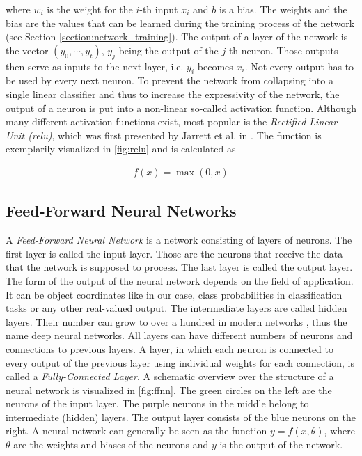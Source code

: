 \noindent where $w_i$ is the weight for the $i$-th input $x_i$ and $b$ is a bias. The weights and the bias are the values that can be learned during the training process of the network (see Section \ref{section:network_training}). The output of a layer of the network is the vector $(y_0, \cdots, y_t)$, $y_j$ being the output of the $j$-th neuron. Those outputs then serve as inputs to the next layer, i.e. $y_i$ becomes $x_i$. Not every output has to be used by every next neuron. To prevent the network from collapsing into a single linear classifier and thus to increase the expressivity of the network, the output of a neuron is put into a non-linear so-called activation function. Although many different activation functions exist, most popular is the \textit{Rectified Linear Unit (\gls{relu})}, which was first presented by Jarrett et al. in \cite{relu}. The function is exemplarily visualized in \fig \ref{fig:relu} and is calculated as

\begin{align}
f(x) = \max(0, x)
\end{align} 

\subsection{Feed-Forward Neural Networks}

A \textit{Feed-Forward Neural Network} is a network consisting of layers of neurons. The first layer is called the input layer. Those are the neurons that receive the data that the network is supposed to process. The last layer is called the output layer. The form of the output of the neural network depends on the field of application. It can be object coordinates like in our case, class probabilities in classification tasks or any other real-valued output. The intermediate layers are called hidden layers. Their number can grow to over a hundred in modern networks \cite{resnet}, thus the name deep neural networks. All layers can have different numbers of neurons and connections to previous layers. A layer, in which each neuron is connected  to every output of the previous layer using individual weights for each connection, is called a \textit{Fully-Connected Layer}. A schematic overview over the structure of a neural network is visualized in \fig \ref{fig:ffnn}. The green circles on the left are the neurons of the input layer. The purple neurons in the middle belong to intermediate (hidden) layers. The output layer consists of the blue neurons on the right. A neural network can generally be seen as the function $y=f(x,\theta)$, where $\theta$ are the weights and biases of the neurons and $y$ is the output of the network.

